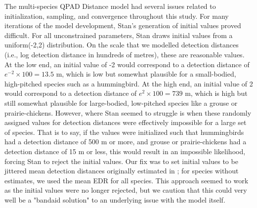\documentclass[12pt]{article}
\begin{document}
\par The multi-species QPAD Distance model had several issues related to initialization, sampling, and convergence throughout this study.
For many iterations of the model development, Stan's generation of initial values proved difficult.
For all unconstrained parameters, Stan draws initial values from a uniform(-2,2) distribution.
On the scale that we modelled detection distances (i.e., log detection distance in hundreds of metres), these are reasonable values.
At the low end, an initial value of -2 would correspond to a detection distance of $e^{-2} \times 100 = 13.5$ m, which is low but somewhat plausible for a small-bodied, high-pitched species such as a hummingbird.
At the high end, an initial value of 2 would correspond to a detection distance of $e^{2} \times 100 = 739$ m, which is high but still somewhat plausible for large-bodied, low-pitched species like a grouse or prairie-chickens.
However, where Stan seemed to struggle is when these randomly assigned values for detection distances were effectively impossible for a large set of species.
That is to say, if the values were initialized such that hummingbirds had a detection distance of 500 m or more, and grouse or prairie-chickens had a detection distance of 15 m or less, this would result in an impossible likelihood, forcing Stan to reject the initial values.
Our fix was to set initial values to be jittered mean detection distances originally estimated in \citet{edwards_point_2023}; for species without estimates, we used the mean EDR for all species.
This approach seemed to work as the initial values were no longer rejected, but we caution that this could very well be a "bandaid solution" to an underlying issue with the model itself.
\end{document}
